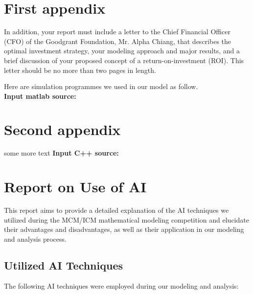 \documentclass{mcmthesis}
\begin{document}
\newpage

\begin{appendices}

\section{First appendix}

In addition, your report must include a letter to the Chief Financial Officer (CFO) of the Goodgrant Foundation, Mr. Alpha Chiang, that describes the optimal investment strategy, your modeling approach and major results, and a brief discussion of your proposed concept of a return-on-investment (ROI). This letter should be no more than two pages in length.

Here are simulation programmes we used in our model as follow.\\

\textbf{\textcolor[rgb]{0.98,0.00,0.00}{Input matlab source:}}


\section{Second appendix}

some more text \textcolor[rgb]{0.98,0.00,0.00}{\textbf{Input C++ source:}}


\end{appendices}

\newpage
{}
\setcounter{lastpage}{\value{page}}
\thispagestyle{empty} 

\section*{Report on Use of AI}

This report aims to provide a detailed explanation of the AI techniques we utilized during the MCM/ICM mathematical modeling competition and elucidate their advantages and disadvantages, as well as their application in our modeling and analysis process.

\subsection*{Utilized AI Techniques}

The following AI techniques were employed during our modeling and analysis:
\end{document}
